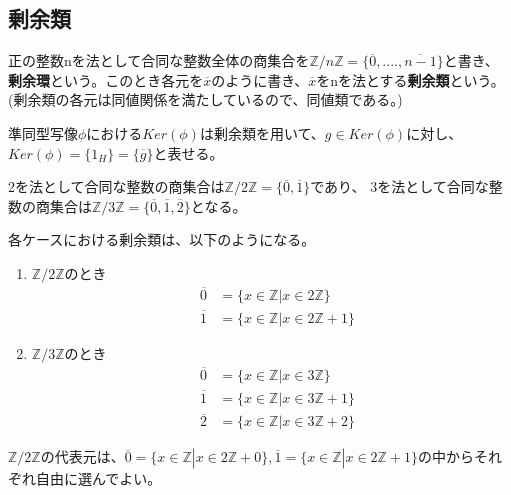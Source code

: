 \documentclass[dvipdfmx,autodetect-engine]{jsarticle}
\begin{document}
\subsection{剰余類}

\label{defi:IntegerCoset}

正の整数nを法として合同な整数全体の商集合を$\mathbb{Z}/n\mathbb{Z} = \{\overline{0}, ...., \overline{n - 1}\}$と書き、{\bf 剰余環}という。このとき各元を$\overline{x}$のように書き、$\overline{x}$をnを法とする{\bf 剰余類}という。(剰余類の各元は同値関係を満たしているので、同値類である。)

\exam 準同型写像$\phi$における$Ker(\phi)$は剰余類を用いて、$g \in Ker(\phi)$に対し、$Ker(\phi) = \{1_H\} = \{\overline{g}\}$と表せる。

\exam 2を法として合同な整数の商集合は$\mathbb{Z}/2\mathbb{Z} = \{\overline{0}, \overline{1}\}$であり、
3を法として合同な整数の商集合は$\mathbb{Z}/3\mathbb{Z} = \{\overline{0}, \overline{1}, \overline{2}\}$となる。

各ケースにおける剰余類は、以下のようになる。

\begin{enumerate}
\renewcommand{\labelenumi}{(\arabic{enumi})}
\item $\mathbb{Z}/2\mathbb{Z}$のとき
\begin{eqnarray*}
&\overline{0} &= \{x \in \mathbb{Z}|x \in 2\mathbb{Z}\} \\
&\overline{1} &= \{x \in \mathbb{Z}|x \in 2\mathbb{Z} + 1\}
\end{eqnarray*}

\item $\mathbb{Z}/3\mathbb{Z}$のとき
\begin{eqnarray*}
&\overline{0} &= \{x \in \mathbb{Z}|x \in 3\mathbb{Z}\} \\
&\overline{1} &= \{x \in \mathbb{Z}|x \in 3\mathbb{Z} + 1\} \\
&\overline{2} &= \{x \in \mathbb{Z}|x \in 3\mathbb{Z} + 2\}
\end{eqnarray*}
\end{enumerate}


$\mathbb{Z}/2\mathbb{Z}$の代表元は、$\overline{0} = \{x \in \mathbb{Z}|x \in 2\mathbb{Z} + 0\}, \overline{1} = \{x \in \mathbb{Z}|x \in 2\mathbb{Z} + 1\}$の中からそれぞれ自由に選んでよい。

\end{document}
